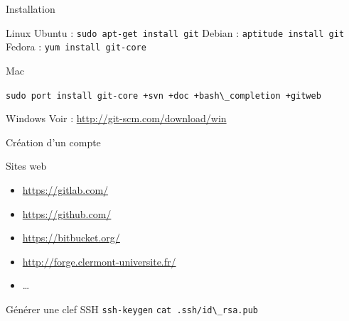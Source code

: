 \documentclass{beamer}
\begin{document}
\begin{frame}{Installation}

  \begin{block}{Linux}
    Ubuntu : \textcolor{commandcolor}{\verb?sudo apt-get install git?}\linebreak
    Debian : \textcolor{commandcolor}{\verb?aptitude install git?}\linebreak
    Fedora : \textcolor{commandcolor}{\verb?yum install git-core?}
  \end{block}

  \begin{block}{Mac}
    \begin{scriptsize}
      \textcolor{commandcolor}{\verb?sudo port install git-core +svn +doc +bash\_completion +gitweb?}
    \end{scriptsize}
  \end{block}

  \begin{block}{Windows}
    Voir : \url{http://git-scm.com/download/win}
  \end{block}

\end{frame}

\begin{frame}{Création d'un compte}

  \begin{block}{Sites web}
    \begin{itemize}
    \item \url{https://gitlab.com/}
    \item \url{https://github.com/}
    \item \url{https://bitbucket.org/}
    \item \url{http://forge.clermont-universite.fr/}
    \item \dots
    \end{itemize}
  \end{block}

  \begin{block}{Générer une clef SSH}
    \textcolor{commandcolor}{\verb?ssh-keygen?}\linebreak
    \textcolor{commandcolor}{\verb?cat .ssh/id\_rsa.pub ?}
  \end{block}

\end{frame}
\end{document}
